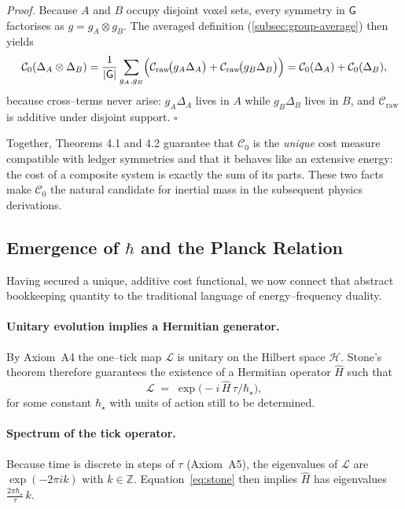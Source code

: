 \documentclass[11pt]{article}
\begin{document}
\textit{Proof.}
Because \(A\) and \(B\) occupy disjoint voxel sets, every symmetry in
\(\mathsf{G}\) factorises as \(g=g_{A}\otimes g_{B}\).  The averaged
definition (\ref{subsec:group-average}) then yields
\[
\mathcal{C}_{0}(\Delta_{A}\otimes\Delta_{B})
=\frac{1}{|\mathsf{G}|}
\sum_{g_{A},g_{B}}
\Bigl(
\mathcal{C}_{\text{raw}}\!\bigl(g_{A}\Delta_{A}\bigr)
+
\mathcal{C}_{\text{raw}}\!\bigl(g_{B}\Delta_{B}\bigr)
\Bigr)
=
\mathcal{C}_{0}(\Delta_{A})+\mathcal{C}_{0}(\Delta_{B}),
\]
because cross–terms never arise: \(g_{A}\Delta_{A}\) lives in \(A\) while
\(g_{B}\Delta_{B}\) lives in \(B\), and \(\mathcal{C}_{\text{raw}}\) is
additive under disjoint support.  \(\square\)

\medskip
\noindent
Together, Theorems 4.1 and 4.2 guarantee that
\(\mathcal{C}_{0}\) is the \emph{unique} cost measure compatible with
ledger symmetries and that it behaves like an extensive energy: the cost
of a composite system is exactly the sum of its parts.  These two facts
make \(\mathcal{C}_{0}\) the natural candidate for inertial mass in the
subsequent physics derivations.

\subsection{Emergence of \texorpdfstring{$\hbar$}{ħ} and the Planck Relation}
\label{subsec:planck-emergence}

Having secured a unique, additive cost functional, we now connect that
abstract bookkeeping quantity to the traditional language of
energy–frequency duality.

\paragraph{Unitary evolution implies a Hermitian generator.}
By Axiom~A4 the one–tick map \(\mathcal{L}\) is unitary on the Hilbert
space \(\mathcal{H}\).  Stone’s theorem therefore guarantees the
existence of a Hermitian operator \(\widehat{H}\) such that
\begin{equation}
\label{eq:stone}
\mathcal{L}
\;=\;
\exp\!\bigl(-i\,\widehat{H}\,\tau/\hbar_{\star}\bigr),
\end{equation}
for some constant \(\hbar_{\star}\) with units of action still to be
determined.

\paragraph{Spectrum of the tick operator.}
Because time is discrete in steps of \(\tau\) (Axiom~A5),
the eigenvalues of \(\mathcal{L}\) are
\(\exp(-2\pi i k)\) with \(k\in\mathbb{Z}\).
Equation~\eqref{eq:stone} then implies
\(\widehat{H}\) has eigenvalues
\(\frac{2\pi\hbar_{\star}}{\tau}\,k\).
\end{document}
